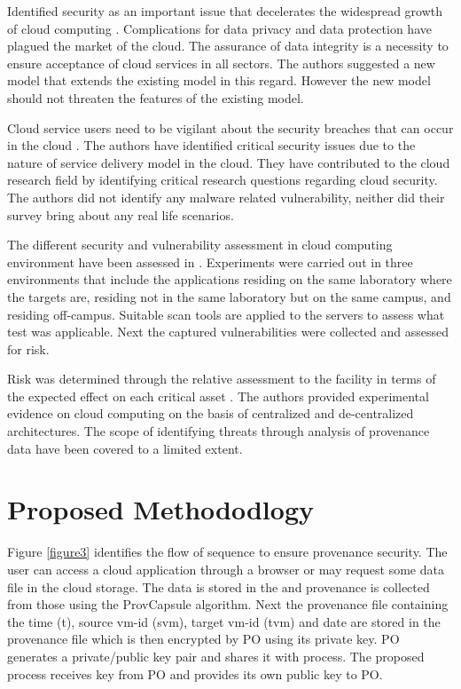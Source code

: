 \documentclass[conference]{IEEEtran}
\begin{document}
Identified security as an important issue that decelerates the widespread growth of cloud computing \cite{abbadi2011challenges}. Complications for data privacy and data protection have plagued the market of the cloud. The assurance of data integrity is a necessity to ensure acceptance of cloud services in all sectors. The authors suggested a new model that extends the existing model in this regard. However the new model should not threaten the features of the existing model.

Cloud service users need to be vigilant about the security breaches that can occur in the cloud \cite{abbadi2011challenges}. The authors have identified critical security issues due to the nature of service delivery model in the cloud. They have contributed to the cloud research field by identifying critical research questions regarding cloud security. The authors did not identify any malware related vulnerability, neither did their survey bring about any real life scenarios.

The different security and vulnerability assessment in cloud computing environment have been assessed in \cite{ko2011flogger}. Experiments were carried out in three environments that include the applications residing on the same laboratory where the targets are, residing not in the same laboratory but on the same campus, and residing off-campus. Suitable scan tools are applied to the servers to assess what test was applicable. Next the captured vulnerabilities were collected and assessed for risk.

Risk was determined through the relative assessment to the facility in terms of the expected effect on each critical asset \cite{ko2011flogger}. The authors provided experimental evidence on cloud computing on the basis of centralized and de-centralized architectures. The scope of identifying threats through analysis of provenance data have been covered to a limited extent.

\section{Proposed Methododlogy}
Figure \ref{figure3} identifies the flow of sequence to ensure provenance security. The user can access a cloud application through a browser or may request some data file in the cloud storage. The data is stored in the  and provenance is collected from those using the ProvCapsule algorithm. Next the provenance file containing the time (t), source vm-id (svm), target vm-id (tvm) and date are stored in the provenance file which is then encrypted by PO using its private key. PO generates a private/public key pair and shares it with  process. The proposed  process receives key  from PO and provides its own public key  to PO.
\end{document}
